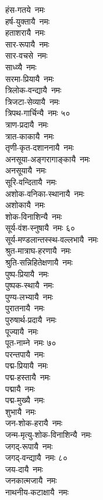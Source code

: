 \begin{multicols}{2}
\begin{flushleft}
हंस-गतये~नमः\\
हर्ष-युक्तायै~नमः\\
हताशरायै~नमः\\
सार-रूपायै~नमः\\
सार-वचसे~नमः\\
साध्व्यै~नमः\\
सरमा-प्रियायै~नमः\\
त्रिलोक-वन्द्यायै~नमः\\
त्रिजटा-सेव्यायै~नमः\\
त्रिपथ-गार्चिन्यै~नमः \hfill ५०\\
त्राण-प्रदायै~नमः\\
त्रात-काकायै~नमः\\
तृणी-कृत-दशाननायै~नमः\\
अनसूया-अङ्गरागाङ्कायै~नमः\\
अनसूयायै~नमः\\
सूरि-वन्दितायै~नमः\\
अशोक-वनिका-स्थानायै~नमः\\
अशोकायै~नमः\\
शोक-विनाशिन्यै~नमः\\
सूर्य-वंश-स्नुषायै~नमः \hfill ६०\\
सूर्य-मण्डलान्तस्स्थ-वल्लभायै~नमः\\
श्रुत-मात्राघ-हरणायै~नमः\\
श्रुति-सन्निहितेक्षणायै~नमः\\
पुष्प-प्रियायै~नमः\\
पुष्पक-स्थायै~नमः\\
पुण्य-लभ्यायै~नमः\\
पुरातनायै~नमः\\
पुरुषार्थ-प्रदायै~नमः\\
पूज्यायै~नमः\\
पूत-नाम्ने~नमः \hfill ७०\\
परन्तपायै~नमः \\
पद्म-प्रियायै~नमः\\
पद्म-हस्तायै~नमः\\
पद्मायै~नमः\\
पद्म-मुख्यै~नमः\\
शुभायै~नमः\\
जन-शोक-हरायै~नमः\\
जन्म-मृत्यु-शोक-विनाशिन्यै~नमः\\
जगद्-रूपायै~नमः\\
जगद्-वन्द्यायै~नमः \hfill ८०\\
जय-दायै~नमः \\
जनकात्मजायै~नमः\\
नाथनीय-कटाक्षायै~नमः\\

\end{flushleft}
\end{multicols}
